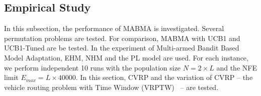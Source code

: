 \subsection{Empirical Study}

In this subsection, the performance of MABMA is investigated. Several permutation problems are tested. For comparison, MABMA with  UCB1 and UCB1-Tuned are be tested. In the experiment of Multi-armed Bandit Based Model Adaptation,  EHM, NHM and the PL model are used. For each instance, we perform independent 10 runs with the population size $N = 2 \times L$ and the NFE limit $E_{max} = L \times 40000$. In this section, CVRP and the variation of CVRP -- the vehicle routing problem with Time Window (VRPTW)~\citep{toth2001vehicle} -- are tested.


